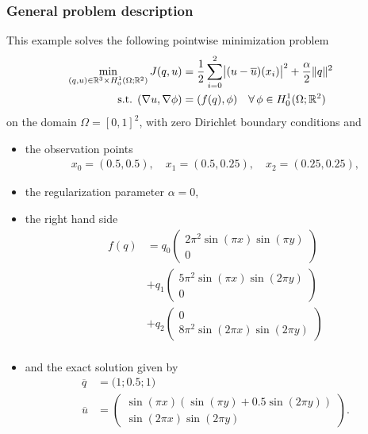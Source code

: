 \subsubsection{General problem description}
This example solves the following pointwise minimization problem
\begin{align*}
\min_{(q,u)\in \mathbb R^3 \times H_0^1(\Omega; \mathbb R^2)} J(q,u) &= \frac{1}{2} \sum_{i=0}^2\abs{(u-\overline u)(x_i)}^2 + \frac{\alpha}{2}\|q\|^2&&\\
\text{s.t. } (\nabla u,\nabla \phi) &= (f(q),\phi) \quad\forall\,\phi \in H^1_0(\Omega; \mathbb R^2)
\end{align*}
on the domain $\Omega = [0,1]^2$, with zero Dirichlet boundary conditions and
\begin{itemize}
\item the observation points
\begin{align*}
x_0 = (0.5, 0.5), \quad x_1 = (0.5, 0.25),\quad x_2 = (0.25, 0.25),
\end{align*}
\item the regularization parameter $\alpha = 0$, 
\item the right hand side
\begin{align*}
 f(q) &= q_0 \left(\begin{matrix}2\pi^2  \sin( \pi x) \sin(\pi y)\\0 \end{matrix}\right)\\
      &+ q_1 \left(\begin{matrix}5\pi^2  \sin( \pi x) \sin(2\pi y)\\0 \end{matrix}\right)\\
      &+ q_2 \left(\begin{matrix}0 \\8\pi^2  \sin(2\pi x) \sin(2\pi y)\end{matrix}\right)\\
\end{align*}
\item and the exact solution given by 
\begin{align*}
 \overline{q} &= \bigl(1;0.5;1\bigr)\\
 \overline{u}& = \left(\begin{matrix} \sin( \pi x)( \sin(\pi y)+0.5\sin(2\pi y))\\\sin(2\pi x) \sin(2\pi y) \end{matrix}\right).
\end{align*}
\end{itemize}
